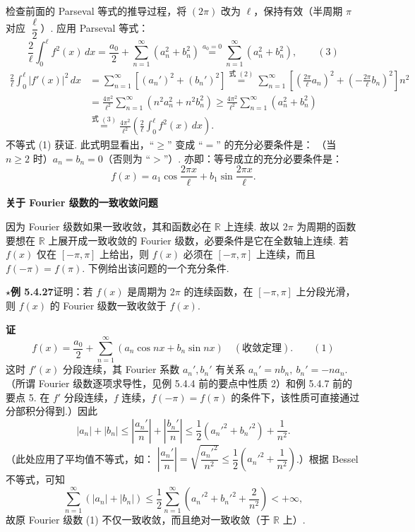 \documentclass[UTF8, 12pt, fontset=fandol, oneside]{ctexart}
\providecommand{\xlongequal}[1]{\stackrel{#1}{=}}
\begin{document}
检查前面的 Parseval 等式的推导过程，将 $(2\pi)$ 改为 $\ell$，保持有效（半周期 $\pi$ 对应 $\dfrac{\ell}{2}$）. 应用 Parseval 等式：
\[
  \frac2{\ell}\int_0^{\ell}f^2(x)\,dx
  =\frac{a_0}{2}+\sum_{n=1}^{\infty}(a_n^2+b_n^2)
  \xlongequal{a_0=0}\sum_{n=1}^{\infty}(a_n^2+b_n^2), \qquad(3)
\]
\[
\begin{aligned}
\frac2{\ell}\int_0^{\ell}|f'(x)|^2\,dx
&=\sum_{n=1}^{\infty}[(a_n')^2+(b_n')^2]
\xlongequal{\text{式 }(2)}
\sum_{n=1}^{\infty}\left[\left(\frac{2\pi}{\ell}a_n\right)^2+
\left(-\frac{2\pi}{\ell}b_n\right)^2\right]n^2\\
&=\frac{4\pi^2}{\ell^2}\sum_{n=1}^{\infty}(n^2a_n^2+n^2b_n^2)
\ge\frac{4\pi^2}{\ell^2}\sum_{n=1}^{\infty}(a_n^2+b_n^2)\\
&\xlongequal{\text{式 }(3)}
\frac{4\pi^2}{\ell^2}\left(\frac2{\ell}\int_0^{\ell}f^2(x)\,dx\right).
\end{aligned}
\]
不等式 (1) 获证. 此式明显看出，``$\ge$'' 变成 ``$=$'' 的充分必要条件是：
（当 $n\ge2$ 时）$a_n=b_n=0$（否则为 ``$>$''）. 亦即：等号成立的充分必要条件是：
\[
  f(x)=a_1\cos\frac{2\pi x}{\ell}+b_1\sin\frac{2\pi x}{\ell}.
\]

\noindent\textbf{关于 Fourier 级数的一致收敛问题}

因为 Fourier 级数如果一致收敛，其和函数必在 $\mathbb R$ 上连续. 故以 $2\pi$ 为周期的函数要想在 $\mathbb R$ 上展开成一致收敛的 Fourier 级数，必要条件是它在全数轴上连续. 若
$f(x)$ 仅在 $[-\pi,\pi]$ 上给出，则 $f(x)$ 必须在 $[-\pi,\pi]$ 上连续，而且
$f(-\pi)=f(\pi)$. 下例给出该问题的一个充分条件.

\noindent\(\star\)\textbf{例 5.4.27}\quad 证明：若 $f(x)$ 是周期为 $2\pi$ 的连续函数，在 $[-\pi,\pi]$ 上分段光滑，则 $f(x)$ 的 Fourier 级数一致收敛于 $f(x)$.

\noindent\textbf{证}\quad
\[
  f(x)=\frac{a_0}{2}+\sum_{n=1}^{\infty}(a_n\cos nx+b_n\sin nx) \quad(\text{收敛定理}). \qquad(1)
\]
这时 $f'(x)$ 分段连续，其 Fourier 系数 $a_n',b_n'$ 有关系
$a_n'=nb_n,\ b_n'=-na_n$.
（所谓 Fourier 级数逐项求导性，见例 5.4.4 前的要点中性质 2）和例 5.4.7 前的要点 5. 在 $f'$ 分段连续，$f$ 连续，$f(-\pi)=f(\pi)$ 的条件下，该性质可直接通过分部积分得到.）因此
\[
  |a_n|+|b_n|\le\left|\frac{a_n'}{n}\right|+\left|\frac{b_n'}{n}\right|
  \le\frac12(a_n'^2+b_n'^2)+\frac1{n^2}.
\]
（此处应用了平均值不等式，如：
$\left|\dfrac{a_n'}{n}\right|=\sqrt{\dfrac{a_n'^2}{n^2}}\le
\dfrac12\left(a_n'^2+\dfrac1{n^2}\right)$.）根据 Bessel 不等式，可知
\[
  \sum_{n=1}^{\infty}(|a_n|+|b_n|)
  \le\frac12\sum_{n=1}^{\infty}\left(a_n'^2+b_n'^2+\frac2{n^2}\right)<+\infty,
\]
故原 Fourier 级数 (1) 不仅一致收敛，而且绝对一致收敛（于 $\mathbb R$ 上）.
\end{document}
